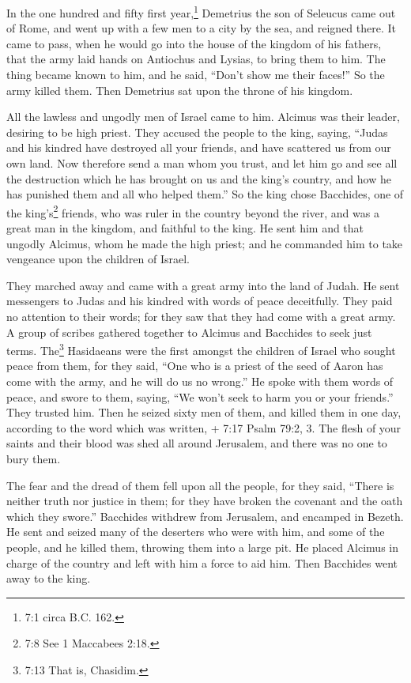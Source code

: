  In the one hundred and fifty first year,\footnote{7:1 circa
  B.C. 162.} Demetrius the son of Seleucus came out of Rome, and went up
with a few men to a city by the sea, and reigned there.  It
came to pass, when he would go into the house of the kingdom of his
fathers, that the army laid hands on Antiochus and Lysias, to bring them
to him.  The thing became known to him, and he said, ``Don't
show me their faces!''  So the army killed them. Then
Demetrius sat upon the throne of his kingdom.

 All the lawless and ungodly men of Israel came to him.
Alcimus was their leader, desiring to be high priest.  They
accused the people to the king, saying, ``Judas and his kindred have
destroyed all your friends, and have scattered us from our own land.
 Now therefore send a man whom you trust, and let him go and
see all the destruction which he has brought on us and the king's
country, and how he has punished them and all who helped them.''
 So the king chose Bacchides, one of the king's\footnote{7:8
  See 1 Maccabees 2:18.} friends, who was ruler in the country beyond
the river, and was a great man in the kingdom, and faithful to the king.
 He sent him and that ungodly Alcimus, whom he made the high
priest; and he commanded him to take vengeance upon the children of
Israel.

 They marched away and came with a great army into the land
of Judah. He sent messengers to Judas and his kindred with words of
peace deceitfully.  They paid no attention to their words;
for they saw that they had come with a great army.  A group
of scribes gathered together to Alcimus and Bacchides to seek just
terms.  The\footnote{7:13 That is, Chasidim.} Hasidaeans
were the first amongst the children of Israel who sought peace from
them,  for they said, ``One who is a priest of the seed of
Aaron has come with the army, and he will do us no wrong.''
 He spoke with them words of peace, and swore to them,
saying, ``We won't seek to harm you or your friends.'' 
They trusted him. Then he seized sixty men of them, and killed them in
one day, according to the word which was written,  + 7:17
Psalm 79:2, 3. The flesh of your saints and their blood was shed all
around Jerusalem, and there was no one to bury them.

 The fear and the dread of them fell upon all the people,
for they said, ``There is neither truth nor justice in them; for they
have broken the covenant and the oath which they swore.'' 
Bacchides withdrew from Jerusalem, and encamped in Bezeth. He sent and
seized many of the deserters who were with him, and some of the people,
and he killed them, throwing them into a large pit.  He
placed Alcimus in charge of the country and left with him a force to aid
him. Then Bacchides went away to the king.

